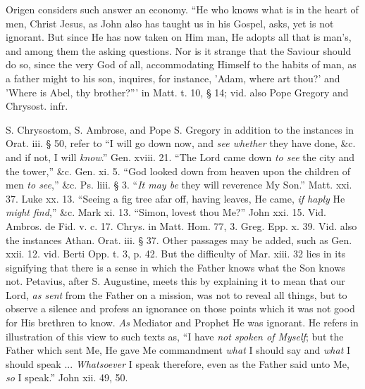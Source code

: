 Origen considers such answer an economy. ``He
who knows what is in the heart of men, Christ Jesus, as John also has
taught us in his Gospel, asks, yet is not ignorant. But since He has
now taken on Him man, He adopts all that is man's, and among them
the asking questions. Nor is it strange that the Saviour should do so,
since the very God of all, accommodating Himself to the habits of man,
as a father might to his son, inquires, for instance, 'Adam, where art
thou?' and 'Where is Abel, thy brother?''' in Matt. t. 10, § 14; vid.
also Pope Gregory and Chrysost. infr.

S. Chrysostom, S. Ambrose, and Pope S. Gregory in
addition to the instances in Orat. iii. § 50, refer to ``I will go
down now, and \emph{see whether} they have done, \&c. and if not, I
will \emph{know}.'' Gen. xviii. 21. ``The Lord came down \emph{to see}
the city and the tower,'' \&c. Gen. xi. 5. ``God looked down from
heaven upon the children of men \emph{to see},'' \&c. Ps. liii. §
3. ``\emph{It may be} they will reverence My Son.'' Matt. xxi. 37.
Luke xx. 13. ``Seeing a fig tree afar off, having leaves, He came, \emph{if
haply} He \emph{might find},'' \&c. Mark xi. 13. ``Simon,
lovest thou Me?'' John xxi. 15. Vid. Ambros. de Fid. v. c. 17. Chrys.
in Matt. Hom. 77, 3. Greg. Epp. x. 39. Vid. also the instances Athan.
Orat. iii. § 37. Other passages may be added, such as Gen. xxii. 12.
vid. Berti Opp. t. 3, p. 42. But the difficulty of Mar. xiii. 32 lies
in its signifying that there is a sense in which the Father knows what
the Son knows not. Petavius, after S. Augustine, meets this by
explaining it to mean that our Lord, \emph{as sent} from the
Father on a mission, was not to reveal all things, but to observe a
silence and profess an ignorance on those points which it was not good
for His brethren to know. \emph{As} Mediator and Prophet He was
ignorant. He refers in illustration of this view to such texts as, ``I have \emph{not spoken of Myself}; but the Father which sent Me,
He gave Me commandment \emph{what} I should say and \emph{what} I
should speak ... \emph{Whatsoever} I speak therefore, even as the
Father said unto Me, \emph{so} I speak.'' John xii. 49, 50.

